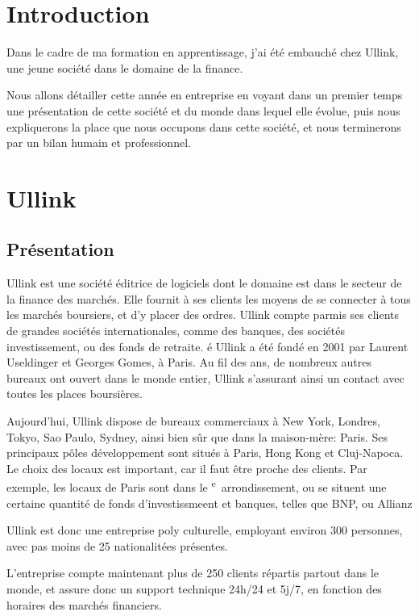 \documentclass[a4paper, 12pt]{article}
\begin{document}

\pagebreak

\section*{Introduction}

Dans le cadre de ma formation en apprentissage, j'ai été embauché chez Ullink, une jeune société dans le domaine de la finance.

Nous allons détailler cette année en entreprise en voyant dans un premier temps une présentation de cette société et du monde dans lequel elle évolue, puis nous expliquerons la place que nous occupons dans cette société, et nous terminerons par un bilan humain et professionnel.
\pagebreak

\tableofcontents
\pagebreak

\section{Ullink}
\subsection{Présentation}
Ullink est une société éditrice de logiciels dont le domaine est dans le secteur de la finance des marchés. Elle fournit à ses clients les moyens de se connecter à tous les marchés boursiers, et d'y placer des ordres. Ullink compte parmis ses clients de grandes sociétés internationales, comme des banques, des sociétés investissement, ou des fonds de retraite.
é
Ullink a été fondé en 2001 par Laurent Useldinger et Georges Gomes, à Paris. Au fil des ans, de nombreux autres bureaux ont ouvert dans le monde entier, Ullink s'assurant ainsi un contact avec toutes les places boursières.

Aujourd'hui, Ullink dispose de bureaux commerciaux à New York, Londres, Tokyo, Sao Paulo, Sydney, ainsi bien sûr que dans la maison-mère: Paris. Ses principaux pôles développement sont situés à Paris, Hong Kong et Cluj-Napoca. Le choix des locaux est important, car il faut être proche des clients. Par exemple, les locaux de Paris sont dans le \textsc{}\textsuperscript{e}~arrondissement, ou se situent une certaine quantité de fonds d'investissmeent et banques, telles que BNP, ou Allianz

Ullink est donc une entreprise poly culturelle, employant environ 300 personnes, avec pas moins de 25 nationalitées présentes.

L'entreprise compte maintenant plus de 250 clients répartis partout dans le monde, et assure donc un support technique 24h/24 et 5j/7, en fonction des horaires des marchés financiers.
\end{document}
